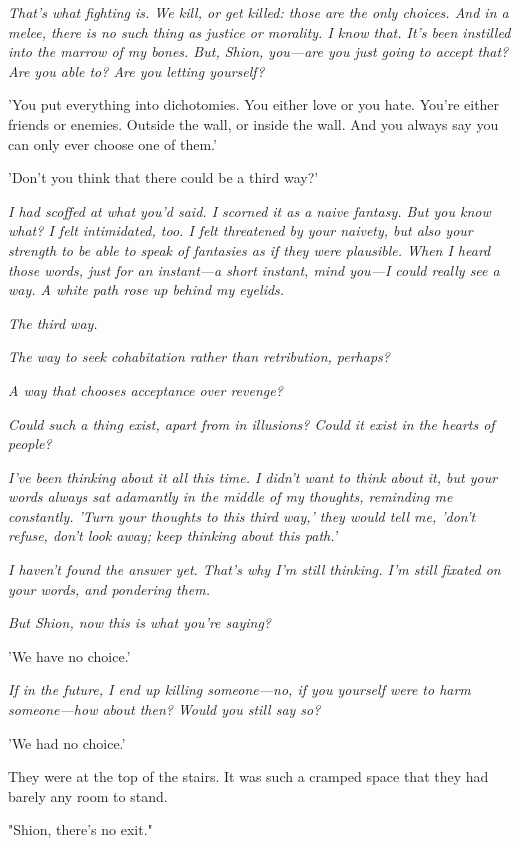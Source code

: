 \emph{That's what fighting is. We kill, or get killed: those are the only
choices. And in a melee, there is no such thing as justice or morality.
I know that. It's been instilled into the marrow of my bones. But,
Shion, you---are you just going to accept that? Are you able to? Are you
letting yourself?}

'You put everything into dichotomies. You either love or you hate.
You're either friends or enemies. Outside the wall, or inside the wall.
And you always say you can only ever choose one of them.'

'Don't you think that there could be a third way?'

\emph{I had scoffed at what you'd said. I scorned it as a naive fantasy. But
you know what? I felt intimidated, too. I felt threatened by your
naivety, but also your strength to be able to speak of fantasies as if
they were plausible. When I heard those words, just for an instant---a
short instant, mind you---I could really see a way. A white path rose up
behind my eyelids.}

\emph{The third way.}

\emph{The way to seek cohabitation rather than retribution, perhaps?}

\emph{A way that chooses acceptance over revenge?}

\emph{Could such a thing exist, apart from in illusions? Could it exist in the
hearts of people?}

\emph{I've been thinking about it all this time. I didn't want to think about
it, but your words always sat adamantly in the middle of my thoughts,
reminding me constantly. 'Turn your thoughts to this third way,' they
would tell me, 'don't refuse, don't look away; keep thinking about this
path.'}

\emph{I haven't found the answer yet. That's why I'm still thinking. I'm still
fixated on your words, and pondering them.}

\emph{But Shion, now this is what you're saying?}

'We have no choice.'

\emph{If in the future, I end up killing someone---no, if you yourself were to
harm someone---how about then? Would you still say so?}

'We had no choice.'

\mybreak

They were at the top of the stairs. It was such a cramped space that
they had barely any room to stand.

"Shion, there's no exit."

